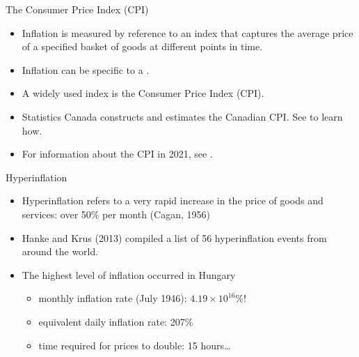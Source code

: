 \documentclass{beamer}
\begin{document}
\begin{frame}{The Consumer Price Index (CPI)}

\begin{itemize}
\item Inflation is measured by reference to an index that captures the average price of a specified basket of goods at different points in time.
\item Inflation can be specific to a \href{https://www150.statcan.gc.ca/t1/tbl1/en/tv.action?pid=1810000501}{}.
\item A widely used index is the Consumer Price Index (CPI).
\item Statistics Canada constructs and estimates the Canadian CPI. See \href{https://www23.statcan.gc.ca/imdb/p2SV.pl?Function=getSurvey&SDDS=2301&lang=en&db=imdb&adm=8&dis=2}{} to learn how.
\item For information about the CPI in 2021, see \href{https://www150.statcan.gc.ca/n1/pub/11-627-m/11-627-m2022004-eng.htm}{}.
\end{itemize}

\end{frame}

\begin{frame}{Hyperinflation}

\begin{itemize}
\item Hyperinflation refers to a very rapid increase in the price of goods and services: over 50\% per month (Cagan, 1956)
\item Hanke and Krus (2013) compiled a list of 56 hyperinflation events from around the world.
\item The highest level of inflation occurred in Hungary
  \begin{itemize}
  \item monthly inflation rate (July 1946): $4.19 \times 10^{16}\%$!
  \item equivalent daily inflation rate: 207\%
  \item time required for prices to double: 15 hours\ldots
  \end{itemize}
\end{itemize}

\end{frame}
\end{document}

